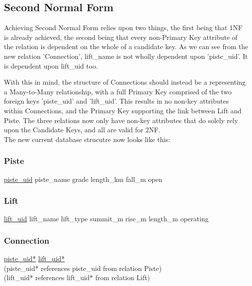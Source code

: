 \documentclass[11pt]{scrartcl} %
\begin{document}
\subsection{Second Normal Form}
Achieving Second Normal Form relies upon two things, the first being that 1NF is already achieved, the second being that every non-Primary Key attribute of the relation is dependent on the whole of a candidate key. As we can see from the new relation 'Connection', lift\_name is not wholly dependent upon 'piste\_uid'. It is dependent upon lift\_uid too.

With this in mind, the structure of Connections should instead be a representing a Many-to-Many relationship, with a full Primary Key comprised of the two foreign keys 'piste\_uid' and 'lift\_uid'. This results in no non-key attributes within Connections, and the Primary Key supporting the link between Lift and Piste. The three relations now only have non-key attributes that do solely rely upon the Candidate Keys, and all are valid for 2NF.\\[0.3cm]
The new current database strucutre now looks like this:

\subsubsection{Piste}
\underline{piste\_uid}\newline
piste\_name\newline
grade\newline
length\_km\newline
fall\_m\newline
open

\subsubsection{Lift}
\underline{lift\_uid}\newline
lift\_name\newline
lift\_type\newline
summit\_m\newline
rise\_m\newline
length\_m\newline
operating

\subsubsection{Connection}
\underline{piste\_uid*}\newline
\underline{lift\_uid*}\\[0.3cm]
(piste\_uid* references piste\_uid from relation Piste)\\
(lift\_uid* references lift\_uid* from relation Lift)
\end{document}
